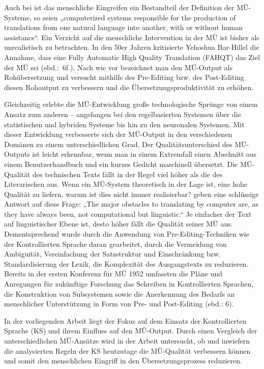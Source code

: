 Auch bei \citep[3]{HutchinsSomers1992} ist das menschliche Eingreifen ein Bestandteil der Definition der MÜ-Systeme, so seien „computerized systems responsible for the production of translations from one natural language into another, with or without human assistance“. Ein Verzicht auf die menschliche Intervention in der MÜ ist bisher als unrealistisch zu betrachten. In den 50er Jahren kritisierte Yehoshua Bar-Hillel die Annahme, dass eine Fully Automatic High Quality Translation (FAHQT) das Ziel der MÜ sei (ebd.:~6f.). Nach wie vor bezeichnet man den MÜ-Output als Rohübersetzung und versucht mithilfe des Pre-Editing bzw. des Post-Editing diesen Rohoutput zu verbessern und die Übersetzungsproduktivität zu erhöhen.

Gleichzeitig erlebte die MÜ-Entwicklung große technologische Sprünge von einem Ansatz zum anderen – angefangen bei den regelbasierten Systemen über die statistischen und hybriden Systeme bis hin zu den neuronalen Systemen. Mit dieser Entwicklung verbesserte sich der MÜ-Output in den verschiedenen Domänen zu einem unterschiedlichen Grad. Der Qualitätsunterschied des MÜ-Outputs ist leicht erkennbar, wenn man in einem Extremfall einen Abschnitt aus einem Benutzerhandbuch und ein kurzes Gedicht maschinell übersetzt. Die MÜ-Qualität des technischen Texts fällt in der Regel viel höher als die des Literarischen aus. Wenn ein MÜ-System theoretisch in der Lage ist, eine hohe Qualität zu liefern, warum ist dies nicht immer realisierbar? \citet[2]{HutchinsSomers1992} geben eine schlüssige Antwort auf diese Frage: „The major obstacles to translating by computer are, as they have always been, not computational but linguistic.“ Je einfacher der Text auf linguistischer Ebene ist, desto höher fällt die Qualität seiner MÜ aus. Dementsprechend wurde durch die Anwendung von Pre-Editing-Techniken wie der Kontrollierten Sprache daran gearbeitet, durch die Vermeidung von Ambiguität, Vereinfachung der Satzstruktur und Einschränkung bzw. Standardisierung der Lexik, die Komplexität des Ausgangstexts zu reduzieren. Bereits in der ersten Konferenz für MÜ 1952 umfassten die Pläne und Anregungen für zukünftige Forschung das Schreiben in Kontrollierten Sprachen, die Konstruktion von Subsystemen sowie die Anerkennung des Bedarfs an menschlicher Unterstützung in Form von Pre- und Post-Editing (ebd.: 6).

In der vorliegenden Arbeit liegt der Fokus auf dem Einsatz der Kontrollierten Sprache (KS) und ihrem Einfluss auf den MÜ-Output. Durch einen Vergleich der unterschiedlichen MÜ-Ansätze wird in der Arbeit untersucht, ob und inwiefern die analysierten Regeln der KS heutzutage die MÜ-Qualität verbessern können und somit den menschlichen Eingriff in den Übersetzungsprozess reduzieren.

